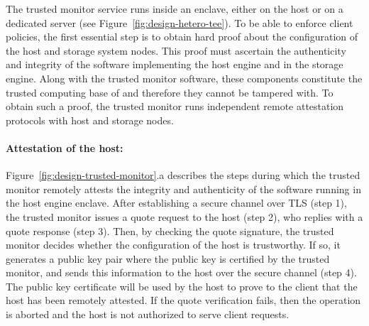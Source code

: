 


The trusted monitor service runs inside an enclave, either on the host or on a dedicated server (see Figure~\ref{fig:design-hetero-tee}). To be able to enforce client policies, the first essential step is to obtain hard proof about the configuration of the host and storage system nodes. This proof must ascertain the authenticity and integrity of the software implementing the host engine and in the storage engine. Along with the trusted monitor software, these components constitute the trusted computing base of \project{} and therefore they cannot be tampered with. To obtain such a proof, the trusted monitor runs independent remote attestation protocols with host and storage nodes.

\paragraph{Attestation of the host:} Figure~\ref{fig:design-trusted-monitor}.a describes the steps during which the trusted monitor remotely attests the integrity and authenticity of the software running in the host engine enclave. After establishing a secure channel over TLS (step 1), the trusted monitor issues a quote request to the host (step 2), who replies with a quote response (step 3). Then, by checking the quote signature, the trusted monitor decides whether the configuration of the host is trustworthy. If so, it generates a public key pair where the public key is certified by the trusted monitor, and sends this information to the host over the secure channel (step 4). The public key certificate will be used by the host to prove to the client that the host has been remotely attested. If the quote verification fails, then the operation is aborted and the host is not authorized to serve \project client requests.

